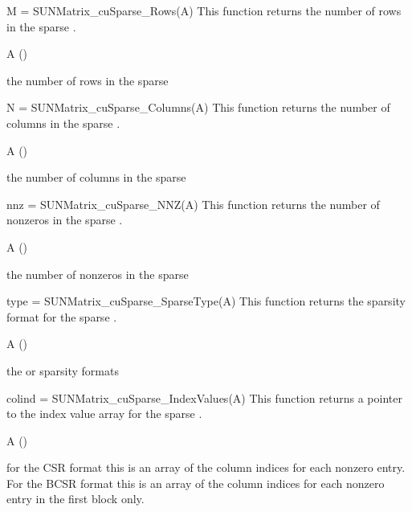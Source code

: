 {
  M = SUNMatrix\_cuSparse\_Rows(A)
}
{
  This function returns the number of rows in the sparse .
}
{
  \begin{args}
  \item[A] ()
  \end{args}
}
{
  the number of rows in the sparse 
}
{
}

{
  N = SUNMatrix\_cuSparse\_Columns(A)
}
{
  This function returns the number of columns in the sparse .
}
{
  \begin{args}
  \item[A] ()
  \end{args}
}
{
  the number of columns in the sparse 
}
{
}

{
  nnz = SUNMatrix\_cuSparse\_NNZ(A)
}
{
  This function returns the number of nonzeros in the sparse .
}
{
  \begin{args}
  \item[A] ()
  \end{args}
}
{
  the number of nonzeros in the sparse 
}
{
}

{
  type = SUNMatrix\_cuSparse\_SparseType(A)
}
{
  This function returns the sparsity format for the sparse .
}
{
  \begin{args}
  \item[A] ()
  \end{args}
}
{
  the  or  sparsity formats
}
{
}

{
  colind = SUNMatrix\_cuSparse\_IndexValues(A)
}
{
  This function returns a pointer to the index value array for the sparse
  .
}
{
  \begin{args}
  \item[A] ()
  \end{args}
}
{
  for the CSR format this is an array of the column indices for each nonzero
  entry. For the BCSR format this is an array of the column indices
  for each nonzero entry in the first block only.
}
{
}

